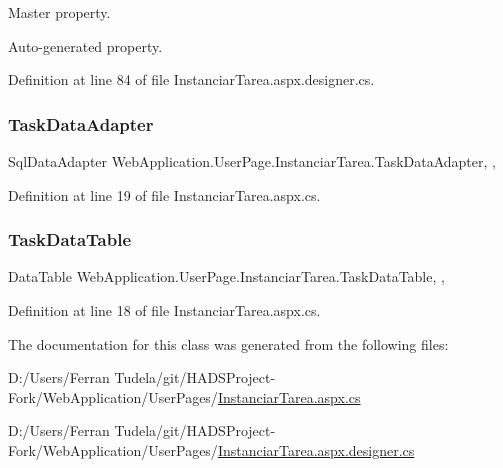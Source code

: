 Master property. 

Auto-\/generated property. 

Definition at line 84 of file Instanciar\+Tarea.\+aspx.\+designer.\+cs.

\mbox{\label{classWebApplication_1_1UserPage_1_1InstanciarTarea_a3fadf343ca9a543ed48897c69c7253a4}} 
\subsubsection{\texorpdfstring{TaskDataAdapter}{TaskDataAdapter}}
{\footnotesize\ttfamily Sql\+Data\+Adapter Web\+Application.\+User\+Page.\+Instanciar\+Tarea.\+Task\+Data\+Adapter\hspace{0.3cm}{\ttfamily [get]}, {\ttfamily [set]}, {\ttfamily [private]}}



Definition at line 19 of file Instanciar\+Tarea.\+aspx.\+cs.

\mbox{\label{classWebApplication_1_1UserPage_1_1InstanciarTarea_a079c2ac82dc950ae13a0ba75b015f9b7}} 
\subsubsection{\texorpdfstring{TaskDataTable}{TaskDataTable}}
{\footnotesize\ttfamily Data\+Table Web\+Application.\+User\+Page.\+Instanciar\+Tarea.\+Task\+Data\+Table\hspace{0.3cm}{\ttfamily [get]}, {\ttfamily [set]}, {\ttfamily [private]}}



Definition at line 18 of file Instanciar\+Tarea.\+aspx.\+cs.



The documentation for this class was generated from the following files\+:\begin{DoxyCompactItemize}
\item 
D\+:/\+Users/\+Ferran Tudela/git/\+H\+A\+D\+S\+Project-\/\+Fork/\+Web\+Application/\+User\+Pages/\mbox{\hyperlink{InstanciarTarea_8aspx_8cs}{Instanciar\+Tarea.\+aspx.\+cs}}\item 
D\+:/\+Users/\+Ferran Tudela/git/\+H\+A\+D\+S\+Project-\/\+Fork/\+Web\+Application/\+User\+Pages/\mbox{\hyperlink{InstanciarTarea_8aspx_8designer_8cs}{Instanciar\+Tarea.\+aspx.\+designer.\+cs}}\end{DoxyCompactItemize}
